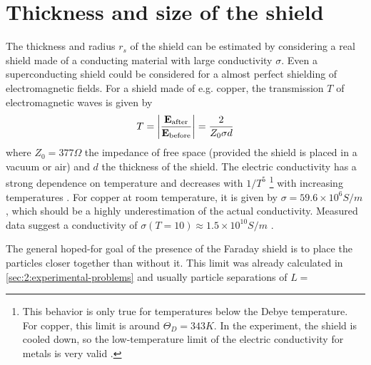 \section{Thickness and size of the shield}\label{sec:5:shield-size}
The thickness and radius $r_s$ of the shield can be estimated by considering a real shield made of a conducting material with large conductivity $\sigma$. 
Even a superconducting shield could be considered for a almost perfect shielding of electromagnetic fields.
For a shield made of e.g. copper, the transmission $T$ of electromagnetic waves is given by \cite{Vandenbosch_2022}
\begin{equation}
  T = \abs{\frac{\vec{E}_\mathrm{after}}{\vec{E}_\mathrm{before}}} = \frac{2}{Z_0 \sigma d}
\end{equation}
where $Z_0 = 377\si{\Omega}$ the impedance of free space (provided the shield is placed in a vacuum or air) and $d$ the thickness of the shield.
The electric conductivity has a strong dependence on temperature and decreases with $1/T^5$ \footnote{This behavior is only true for temperatures below the Debye temperature. For copper, this limit is around $\Theta_D = 343\si{K}$. In the experiment, the shield is cooled down, so the low-temperature limit of the electric conductivity for metals is very valid \cite{Berman_1952}.} with increasing temperatures \cite[p. 284-286]{Gross_2018}. For copper at room temperature, it is given by $\sigma = 59.6\times 10^6 \si{S/m}$, which should be a highly underestimation of the actual conductivity. 
Measured data suggest a conductivity of $\sigma(T = 10) \approx 1.5\times 10^{10}\si{S/m}$ \cite{Berman_1952}.

The general hoped-for goal of the presence of the Faraday shield is to  place the particles closer together than without it.
This limit was already calculated in \cref{sec:2:experimental-problems} and usually particle separations of $L = $

